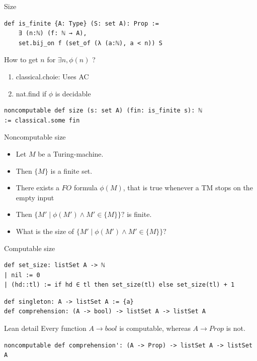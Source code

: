 \documentclass{beamer}
\begin{document}
    \begin{frame}[fragile]{Size}
\begin{lstlisting}
def is_finite {A: Type} (S: set A): Prop := 
    ∃ (n:ℕ) (f: ℕ → A), 
    set.bij_on f (set_of (λ (a:ℕ), a < n)) S
\end{lstlisting}

How to get $n$ for $\exists n, \phi(n)$ ?
\begin{enumerate}
    \item classical.choie: Uses AC
    \item nat.find if $\phi$ is decidable
\end{enumerate}

    \begin{lstlisting}
noncomputable def size (s: set A) (fin: is_finite s): ℕ
:= classical.some fin
\end{lstlisting}
    \end{frame}

    \begin{frame}{Noncomputable size}
        \begin{itemize}
            \item Let $M$ be a Turing-machine.
            \item Then $\{M\}$ is a finite set.
            \item There exists a $FO$ formula $\phi(M)$, that is true whenever a TM stops on the empty input
            \item Then $\{ M' \mid \phi (M') \land M' \in \{M\}\}? $ is finite.
            \item What is the size of $\{ M' \mid \phi (M') \land M' \in \{M\}\}? $
        \end{itemize}
    \end{frame}

    \begin{frame}[fragile]{Computable size}
\begin{lstlisting}
def set_size: listSet A -> ℕ
| nil := 0
| (hd::tl) := if hd ∈ tl then set_size(tl) else set_size(tl) + 1
\end{lstlisting}
\begin{lstlisting}
def singleton: A -> listSet A := {a}
def comprehension: (A -> bool) -> listSet A -> listSet A
\end{lstlisting}
\begin{block}{Lean detail}
    Every function $A \to bool$ is computable, whereas $A \to Prop$ is not.
\end{block}


\begin{lstlisting}
noncomputable def comprehension': (A -> Prop) -> listSet A -> listSet A
\end{lstlisting}
\end{frame}
\end{document}
